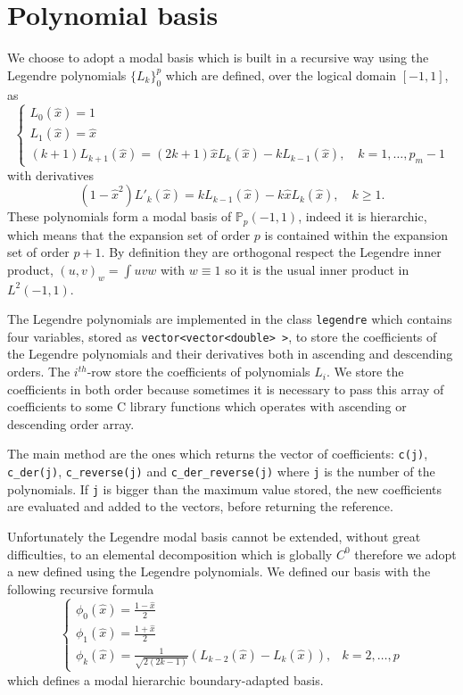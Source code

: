 \section{Polynomial basis}\label{sec:modal_basis}

We choose to adopt a modal basis which is built in a recursive way using the Legendre polynomials $\{L_k\}_0^p$ which are defined, over the logical domain $[-1,1]$, as
\begin{equation}
  \begin{cases}
    L_0(\hat{x})=1\\
    L_1(\hat{x})=\hat{x}\\
    (k+1)L_{k+1}(\hat{x})=(2k+1)\hat{x}L_k(\hat{x})-kL_{k-1}(\hat{x}),\quad k=1,\dots,p_m-1
  \end{cases}
\end{equation}
with derivatives
\begin{equation}
  (1-\hat{x}^2)L'_k(\hat{x})=kL_{k-1}(\hat{x})-k\hat{x} L_k(\hat{x}),\quad k\geq 1.
\end{equation}
These polynomials form a modal basis of $\mathbb{P}_p(-1,1)$, indeed it is hierarchic, which means that the expansion set of order $p$ is contained within the expansion set of order $p+1$. By definition they are orthogonal respect the Legendre inner product, $(u,v)_w=\int uvw$ with $w\equiv 1$ so it is the usual inner product in $L^2(-1,1)$.
\medskip

The Legendre polynomials are implemented in the class \verb|legendre| which contains four variables, stored as \verb|vector<vector<double> >|, to store the coefficients of the Legendre polynomials and their derivatives both in ascending and descending orders. The $i^{th}$-row store the coefficients of polynomials $L_i$. We store the coefficients in both order because sometimes it is necessary to pass this array of coefficients to some C library functions which operates with ascending or descending order array.

The main method are the ones which returns the vector of coefficients: \verb|c(j)|, \verb|c_der(j)|, \verb|c_reverse(j)| and \verb|c_der_reverse(j)| where \verb|j| is the number of the polynomials. If \verb|j| is bigger than the maximum value stored, the new coefficients are evaluated and added to the vectors, before returning the reference.
\medskip

Unfortunately the Legendre modal basis cannot be extended, without great difficulties, to an elemental decomposition which is globally $C^0$ therefore we adopt a new defined using the Legendre polynomials. We defined our basis with the following recursive formula
\begin{equation}\label{eq:modal_basis_1D}
  \begin{cases}
    \phi_0(\hat{x})=\frac{1-\hat{x}}{2}\\
    \phi_1(\hat{x})=\frac{1+\hat{x}}{2}\\
    \phi_k(\hat{x})=\frac{1}{\sqrt{2(2k-1)}}(L_{k-2}(\hat{x})-L_k(\hat{x})), & k=2,\dots,p
  \end{cases}
\end{equation}
which defines a modal hierarchic boundary-adapted basis.

